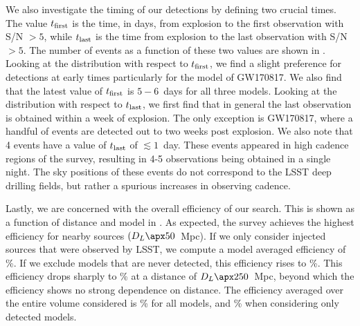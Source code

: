 We also investigate the timing of our detections by defining two crucial times. The value $t_{\rm first}$ is the time, in days, from explosion to the first observation with S/N $> 5$, while $t_{\rm last}$ is the time from explosion to the last observation with S/N $> 5$. The number of events as a function of these two values are shown in . Looking at the distribution with respect to $t_{\rm first}$, we find a slight preference for detections at early times particularly for the model of GW170817.  We also find that the latest value of $t_{\rm first}$ is \apx$5-6$~days for all three models. Looking at the distribution with respect to $t_{\rm last}$, we first find that in general the last observation is obtained within a week of explosion. The only exception is GW170817, where a handful of events are detected out to two weeks post explosion. We also note that 4 events have a value of $t_{\rm last}$ of $\lesssim 1$~day. These events appeared in high cadence regions of the survey, resulting in 4-5 observations being obtained in a single night. The sky positions of these events do not correspond to the LSST deep drilling fields, but rather a spurious increases in observing cadence.


Lastly, we are concerned with the overall efficiency of our search. This is shown as a function of distance and model in . As expected, the survey achieves the highest efficiency for nearby sources $(D_L \apx50$~Mpc). If we only consider injected sources that were observed by LSST, we compute a model averaged efficiency of \%. If we exclude models that are never detected, this efficiency rises to \%. This efficiency drops sharply to \% at a distance of $D_L \apx250$~Mpc, beyond which the efficiency shows no strong dependence on distance. The efficiency averaged over the entire volume considered is \% for all models, and \% when considering only detected models.


